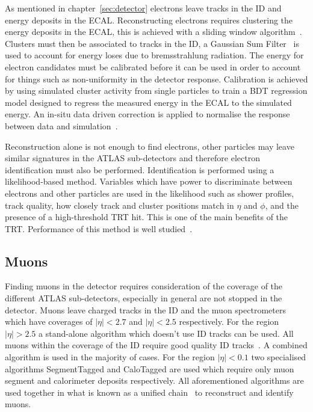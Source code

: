 As mentioned in chapter~\ref{sec:detector} electrons leave tracks in the ID and
energy deposits in the ECAL. Reconstructing electrons requires clustering the
energy deposits in the ECAL, this is achieved with a sliding window
algorithm~\cite{slide}. Clusters must then be associated to tracks in the ID, a
Gaussian Sum Filter~\cite{GSF} is used to account for energy loses due to
bremsstrahlung radiation. The energy for electron candidates must be calibrated
before it can be used in order to account for things such as non-uniformity in
the detector response. Calibration is achieved by using simulated cluster
activity from single particles to train a BDT regression model designed to
regress the measured energy in the ECAL to the simulated energy. An in-situ data
driven correction is applied to normalise the response between data and
simulation~\cite{elec-calibration}.

Reconstruction alone is not enough to find electrons, other particles may leave
similar signatures in the ATLAS sub-detectors and therefore electron
identification must also be performed. Identification is performed using a
likelihood-based method. Variables which have power to discriminate between
electrons and other particles are used in the likelihood such as shower
profiles, track quality, how closely track and cluster positions match in $\eta$
and $\phi$, and the presence of a high-threshold TRT hit. This is one of the
main benefits of the TRT. Performance of this method is well
studied~\cite{2likelihood-electron-id-notes}.

\subsection{Muons}

Finding muons in the detector requires consideration of the coverage of the
different ATLAS sub-detectors, especially in general are not stopped in the
detector. Muons leave charged tracks in the ID and the muon spectrometers which
have coverages of $\lvert \eta \rvert < 2.7$ and $\lvert \eta \rvert < 2.5$
respectively. For the region $\lvert \eta \rvert > 2.5$ a stand-alone algorithm
which doesn't use ID tracks can be used. All muons within the coverage of the ID
require good quality ID tracks~\cite{}. A combined algorithm is used in the
majority of cases. For the region $\lvert  \eta  \rvert < 0.1$ two specialised
algorithms SegmentTagged and CaloTagged are used which require only muon segment
and calorimeter deposits respectively. All aforementioned algorithms are used
together in what is known as a unified chain~\cite{muon-reco-id} to reconstruct and identify
muons.

